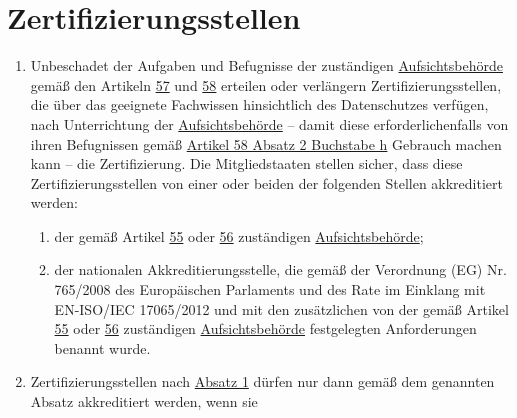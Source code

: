 \chapter{Zertifizierungsstellen}
\label{ch:43}


\begin{enumerate}

  \item Unbeschadet der Aufgaben und Befugnisse der zuständigen \hyperref[itm:04-21]{Aufsichtsbehörde} gemäß den
   Artikeln \hyperref[ch:57]{57} und \hyperref[ch:58]{58} erteilen oder verlängern Zertifizierungsstellen, die über das
   geeignete Fachwissen hinsichtlich des Datenschutzes verfügen, nach Unterrichtung der \hyperref[itm:04-21]
   {Aufsichtsbehörde} -- damit diese erforderlichenfalls von ihren Befugnissen gemäß \hyperref[itm:58-2h]{Artikel 58
   Absatz 2 Buchstabe h} Gebrauch machen kann -- die Zertifizierung. Die Mitgliedstaaten stellen sicher, dass diese
   Zertifizierungsstellen von einer oder beiden der folgenden Stellen akkreditiert werden:%
  \label{itm:43-1}

  \begin{enumerate}
  
    \item der gemäß Artikel \hyperref[ch:55]{55} oder \hyperref[ch:56]{56} zuständigen \hyperref[itm:04-21]
     {Aufsichtsbehörde};%
    \label{itm:43-1a}

    \item der nationalen Akkreditierungsstelle, die gemäß der Verordnung (EG) Nr. 765/2008 des Europäischen Parlaments und des
     Rate im Einklang mit EN-ISO/IEC 17065/2012 und mit den
     zusätzlichen von der gemäß Artikel \hyperref[ch:55]{55} oder \hyperref[ch:56]{56} zuständigen \hyperref[itm:04-21]
     {Aufsichtsbehörde} festgelegten Anforderungen benannt wurde.%
    \label{itm:43-1b}

  \end{enumerate}

  \item Zertifizierungsstellen nach \hyperref[itm:43-1]{Absatz 1} dürfen nur dann gemäß dem genannten Absatz
   akkreditiert werden, wenn sie%
  \label{itm:43-2}


\end{enumerate}
